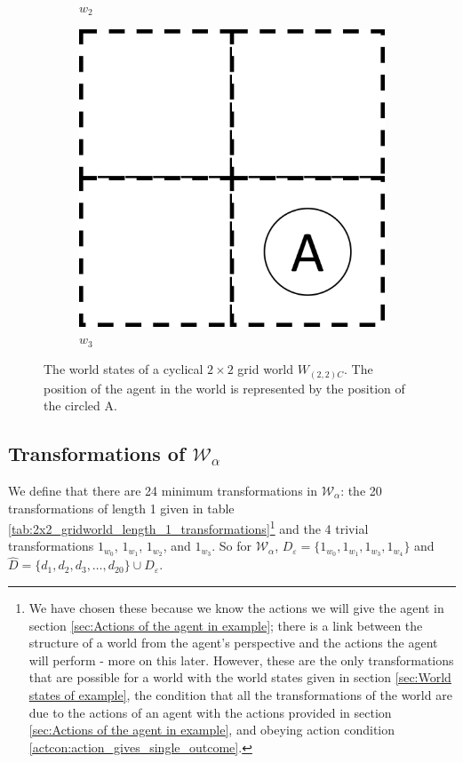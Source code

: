 \begin{figure}[H]
\begin{subfigure}[b]{0.45\linewidth}
		\caption{$w_{2}$}
	\end{subfigure}
	\begin{subfigure}[b]{0.45\linewidth}
		\centering
		\includegraphics[width=0.5\linewidth]{2MathematicalFramework/Images/2x2_no_walls_world_states/w3.png}
		\caption{$w_{3}$}
	\end{subfigure}
	\caption{
		The world states of a cyclical $2\times 2$ grid world $W_{(2,2)C}$.
		The position of the agent in the world is represented by the position of the circled A.
	}
	\label{fig:2x2-cyclical-grid-world-states}
\end{figure}

\subsection{Transformations of $\mathscr{W}_{\alpha}$}

We define that there are 24 minimum transformations in $\mathscr{W}_{\alpha}$: the 20 transformations of length 1 given in table \ref{tab:2x2_gridworld_length_1_transformations}\footnote{
	We have chosen these because we know the actions we will give the agent in section \ref{sec:Actions of the agent in example}; there is a link between the structure of a world from the agent's perspective and the actions the agent will perform - more on this later.
	However, these are the only transformations that are possible for a world with the world states given in section \ref{sec:World states of example}, the condition that all the transformations of the world are due to the actions of an agent with the actions provided in section \ref{sec:Actions of the agent in example}, and obeying action condition \ref{actcon:action_gives_single_outcome}.
}
and the 4 trivial transformations $1_{w_{0}}$, $1_{w_{1}}$, $1_{w_{2}}$, and $1_{w_{3}}$.
So for $\mathscr{W}_{\alpha}$, $D_{\varepsilon} = \{ 1_{w_{0}}, 1_{w_{1}}, 1_{w_{3}}, 1_{w_{4}} \}$ and $\hat{D} = \{ d_{1}, d_{2}, d_{3}, \dots, d_{20} \} \cup D_{\varepsilon}$.

